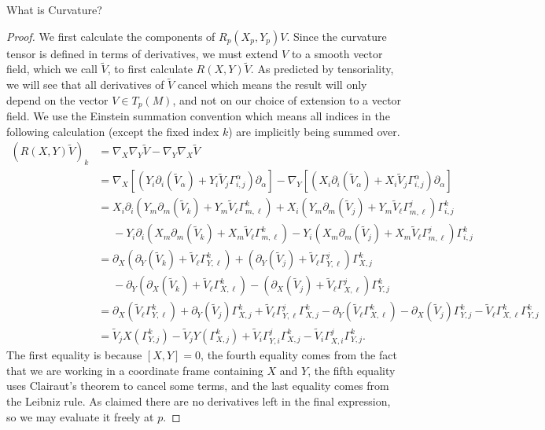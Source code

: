 \documentclass{article}
\numberwithin{equation}{subsection}
\theoremstyle{definition}
\begin{document}
\begin{section}{What is Curvature?}
\begin{proof}
We first calculate the components of $R_p(X_p,Y_p)V$. Since the curvature tensor is defined in terms of derivatives, we must extend $V$ to a smooth vector field, which we call $\tilde{V}$, to first calculate $R(X,Y)\tilde{V}$. As predicted by tensoriality, we will see that all derivatives of $\tilde{V}$ cancel which means the result will only depend on the vector $V\in T_p(M)$, and not on our choice of extension to a vector field. We use the Einstein summation convention which means all indices in the following calculation (except the fixed index $k$) are implicitly being summed over.
\begin{equation}\label{eq1.0.26}
\begin{split}
(R(X,Y)\tilde{V})_k&=\nabla_X\nabla_Y\tilde{V}-\nabla_Y\nabla_X\tilde{V}\\
&=\nabla_X\left[(Y_i\partial_i(\tilde{V}_{\alpha})+Y_i\tilde{V}_j\Gamma_{i,j}^{\alpha})\partial_{\alpha}\right]-\nabla_Y\left[(X_i\partial_i(\tilde{V}_{\alpha})+X_i\tilde{V}_j\Gamma_{i,j}^{\alpha})\partial_{\alpha}\right]\\
&=X_i\partial_i\left(Y_m\partial_m(\tilde{V}_k)+Y_m\tilde{V}_{\ell}\Gamma_{m,\ell}^{k}\right)+X_i\left(Y_m\partial_m(\tilde{V}_j)+Y_m\tilde{V}_{\ell}\Gamma_{m,\ell}^{j}\right)\Gamma_{i,j}^{k}\\
&\phantom{{}={}}-Y_i\partial_i\left(X_m\partial_m(\tilde{V}_k)+X_m\tilde{V}_{\ell}\Gamma_{m,\ell}^{k}\right)-Y_i\left(X_m\partial_m(\tilde{V}_j)+X_m\tilde{V}_{\ell}\Gamma_{m,\ell}^{j}\right)\Gamma_{i,j}^k\\
&=\partial_X\left(\partial_Y(\tilde{V}_k)+\tilde{V}_{\ell}\Gamma_{Y,\ell}^{k}\right)+\left(\partial_Y(\tilde{V}_j)+\tilde{V}_{\ell}\Gamma_{Y,\ell}^{j}\right)\Gamma_{X,j}^{k}\\
&\phantom{{}={}}-\partial_Y\left(\partial_X(\tilde{V}_k)+\tilde{V}_{\ell}\Gamma_{X,\ell}^{k}\right)-\left(\partial_X(\tilde{V}_j)+\tilde{V}_{\ell}\Gamma_{X,\ell}^{j}\right)\Gamma_{Y,j}^{k}\\
&=\partial_{X}(\tilde{V}_{\ell}\Gamma_{Y,\ell}^{k})+\partial_{Y}(\tilde{V}_j)\Gamma_{X,j}^{k}+\tilde{V}_{\ell}\Gamma_{Y,\ell}^{j}\Gamma_{X,j}^k-\partial_{Y}(\tilde{V}_{\ell}\Gamma_{X,\ell}^{k})-\partial_X(\tilde{V}_j)\Gamma_{Y,j}^k-\tilde{V}_{\ell}\Gamma_{X,\ell}^{k}\Gamma_{Y,j}^{k}\\
&=\tilde{V}_jX(\Gamma_{Y,j}^k)-\tilde{V}_jY(\Gamma_{X,j}^k)+\tilde{V}_i\Gamma_{Y,i}^{j}\Gamma_{X,j}^{k}-\tilde{V}_i\Gamma_{X,i}^{j}\Gamma_{Y,j}^{k}.
\end{split}
\end{equation}
The first equality is because $[X,Y]=0$, the fourth equality comes from the fact that we are working in a coordinate frame containing $X$ and $Y$, the fifth equality uses Clairaut's theorem to cancel some terms, and the last equality comes from the Leibniz rule. As claimed there are no derivatives left in the final expression, so we may evaluate it freely at $p$.


\end{proof}
\end{section}
\end{document}
